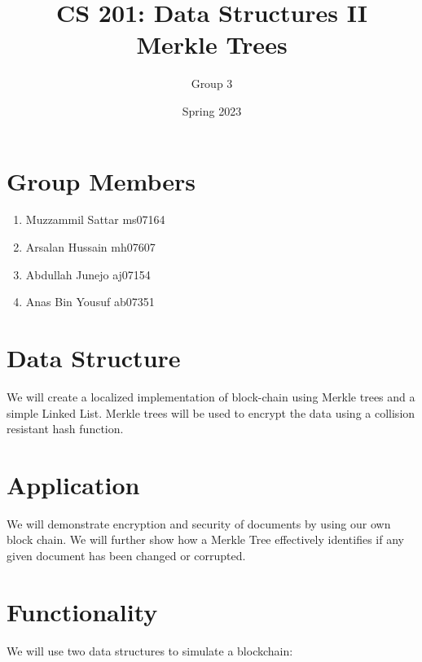 \documentclass{article}
\title {CS 201: Data Structures II \\Merkle Trees} %
\author{Group 3} %
\date{Spring 2023}
\begin{document}
\maketitle
\section{Group Members}
\begin{enumerate}
  \item Muzzammil Sattar ms07164
  \item Arsalan Hussain mh07607
  \item Abdullah Junejo aj07154
  \item Anas Bin Yousuf ab07351
\end{enumerate}
\section{Data Structure}
We will create a localized implementation of block-chain using Merkle trees and a simple Linked List. 
Merkle trees will be used to encrypt the data using a collision resistant hash function. 
\section{Application}
We will demonstrate encryption and security of documents by using our own block chain. We will further show how a Merkle Tree effectively identifies if any given document has been changed or corrupted.  
\section{Functionality}
We will use two data structures to simulate a blockchain:
\end{document}
